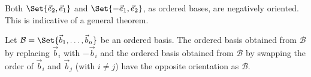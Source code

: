 Both $\Set{\yhat,\xhat}$ and $\Set{-\xhat,\yhat}$, as ordered bases,
are negatively oriented. This is indicative of a general theorem.

\begin{theorem}
	Let $\mathcal B=\Set{\vec b_1,\ldots,\vec b_n}$ be an ordered basis.
	The ordered basis obtained from $\mathcal B$ by replacing $\vec b_i$ with $-\vec b_i$
	and the ordered basis obtained from $\mathcal B$ by swapping the order of $\vec b_i$ and
	$\vec b_{j}$ (with $i\neq j$) have the opposite orientation as $\mathcal B$.
\end{theorem}





